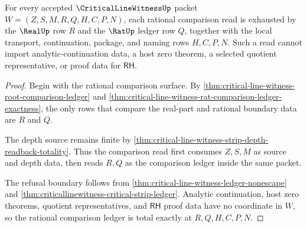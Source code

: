 \begin{theorem}
\label{thm:critical-line-witness-rational-comparison-ledger-totality}
For every accepted $\CriticalLineWitnessUp$ packet $W=(Z,S,M,R,Q,H,C,P,N)$, each rational comparison read is exhausted by the $\RealUp$ row $R$ and the $\RatUp$ ledger row $Q$, together with the local transport, continuation, package, and naming rows $H,C,P,N$. Such a read cannot import analytic-continuation data, a host zero theorem, a selected quotient representative, or proof data for $\mathsf{RH}$.
\end{theorem}
\begin{proof}
Begin with the rational comparison surface. By \autoref{thm:critical-line-witness-root-comparison-ledger} and \autoref{thm:critical-line-witness-rat-comparison-ledger-exactness}, the only rows that compare the real-part and rational boundary data are $R$ and $Q$.

The depth source remains finite by \autoref{thm:critical-line-witness-strip-depth-readback-totality}. Thus the comparison read first consumes $Z,S,M$ as source and depth data, then reads $R,Q$ as the comparison ledger inside the same packet.

The refusal boundary follows from \autoref{thm:critical-line-witness-ledger-nonescape} and \autoref{thm:criticallinewitness-critical-strip-ledger}. Analytic continuation, host zero theorems, quotient representatives, and $\mathsf{RH}$ proof data have no coordinate in $W$, so the rational comparison ledger is total exactly at $R,Q,H,C,P,N$.
\end{proof}

